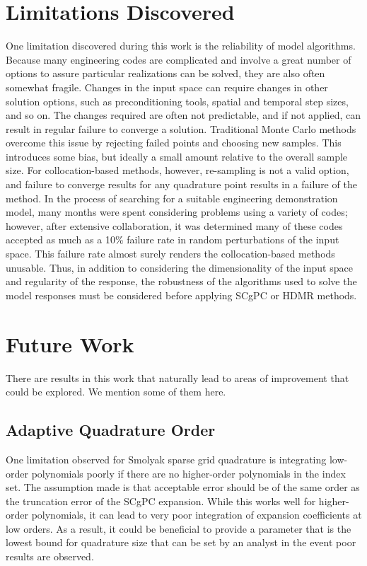 \section{Limitations Discovered}\label{sec:limits}
One limitation discovered during this work is the reliability of model algorithms.  Because many engineering codes are
complicated and involve a great number of options to assure particular realizations can be solved, they are also often
somewhat fragile.  Changes in the input space can require changes in other solution options, such as preconditioning tools,
spatial and temporal step sizes, and so on.  The changes required are often not predictable, and if not applied, can result
in regular failure to converge a solution.  Traditional Monte Carlo methods overcome this issue by rejecting failed points and
choosing new samples.  This introduces some bias, but ideally a small amount relative to the overall sample size.  For
collocation-based methods, however, re-sampling is not a valid option, and failure to converge results for any
quadrature point results in a failure of the method.
In the process of searching for a suitable engineering demonstration model, many months were spent considering
problems using a variety of
codes; however, after extensive collaboration, it was determined many of these codes accepted as much as a 10\% failure rate
in random perturbations of the input space.  This failure rate almost surely renders the collocation-based methods
unusable.  Thus, in addition to considering the dimensionality of the input space and regularity of the response, the
robustness of the algorithms used to solve the model responses must be considered before applying
SCgPC or HDMR methods.

\section{Future Work}\label{sec:future}
There are results in this work that naturally lead to areas of improvement that could be explored.  We mention
some of them here.

\subsection{Adaptive Quadrature Order}
One limitation observed for Smolyak sparse grid quadrature is integrating low-order polynomials poorly if
there are no higher-order polynomials in the index set.  The assumption made is that acceptable error should
be of the same order as the truncation error of the SCgPC expansion.  While this works well for higher-order
polynomials, it can lead to very poor integration of expansion coefficients at low orders.  As a result, it
could be beneficial to provide a parameter that is the lowest bound for quadrature size that can be set by an
analyst in the event poor results are observed.

